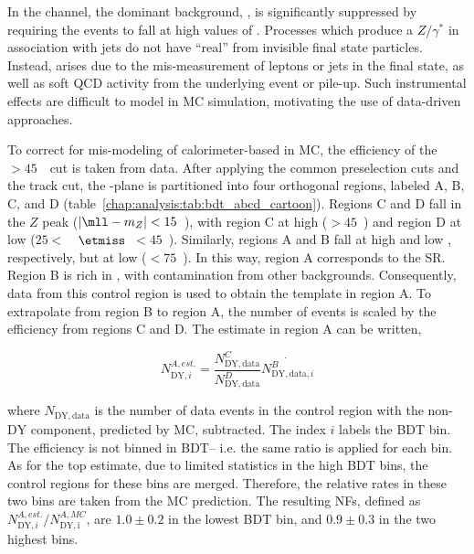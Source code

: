 
In the \eemm channel, the dominant background, \ZDY, is significantly
suppressed by requiring the events to fall at high values of
\etmiss. Processes which produce a $Z/\gamma^{*}$ in association with
jets do not have ``real'' \etmiss from invisible final state
particles. Instead, \etmiss arises due to the mis-measurement of
leptons or jets in the final state, as well as soft QCD activity from the underlying
event or pile-up. Such instrumental effects are difficult to model in
MC simulation, motivating the use of data-driven approaches. 

To correct for mis-modeling of calorimeter-based \etmiss in \ZDY MC, the
efficiency of the \calomet$>45$~\gev~cut is taken from data. After
applying the common preselection cuts and the track \etmiss cut, the
\mll-\etmiss plane is partitioned into four orthogonal regions, labeled A, B, C,
and D (table~\ref{chap:analysis:tab:bdt_abcd_cartoon}). Regions C and D fall in the $Z$ peak ($|\mll -
m_Z| < 15$~\gev), with region C at high \etmiss ($>45$~\gev) and
region D at low \etmiss ($25 < $~\gev~$\etmiss$~$ <
45$~\gev). Similarly, regions A and B fall at high and low \etmiss,
respectively, but at low \mll (\mll$< 75$~\gev). In this way, region A
corresponds to the \eemm SR. Region B is rich in \ZDY, with
 contamination from other backgrounds. Consequently,
data from this control region is used to obtain the \ZDY template in
region A. To extrapolate from region B to region A, the number of
events is scaled by the \etmiss efficiency from regions C and D. The
estimate in region A can be written,

\begin{equation}
\label{chap:analysis:equation:dy_est1}
N_{\mathrm{DY},i}^{A,est.} = \frac{N_{\mathrm{DY},\mathrm{data}}^{C}}{N_{\mathrm{DY},\mathrm{data}}^{D}}\dot{N_{\mathrm{DY},\mathrm{data},i}^{B}}
\end{equation}

\noindent
where $N_{\mathrm{DY},\mathrm{data}}$ is the number of data events in the control
region with the non-$\mathrm{DY}$ component, predicted by MC,
subtracted. The index $i$ labels the BDT bin. The \etmiss efficiency
is not binned in BDT-- i.e. the same ratio is applied for each bin. As
for the top estimate, due to limited statistics in the high BDT bins,
the control regions for these bins are merged. Therefore, the relative
rates in these two bins are taken from the MC prediction. The
resulting NFs, defined as
$N_{\mathrm{DY},i}^{A,est.}/N_{\mathrm{DY,i}}^{A,MC}$, are $1.0 \pm
0.2$ in the lowest BDT bin, and $0.9 \pm 0.3$ in the two highest bins.

